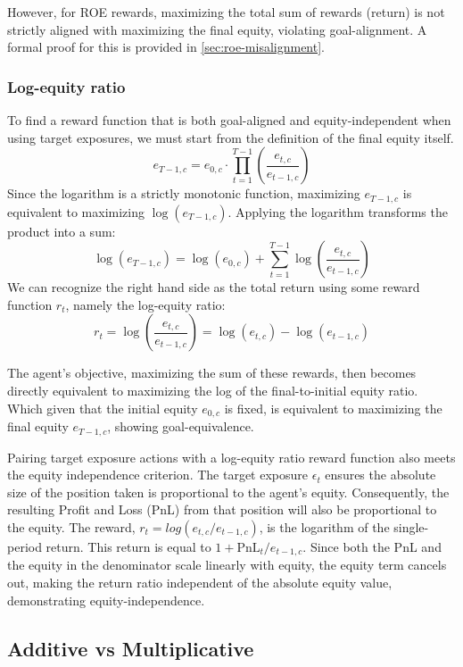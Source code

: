 However, for ROE rewards, maximizing the total sum of rewards (return) is not strictly aligned with maximizing the final equity, violating goal-alignment. A formal proof for this is provided in \cref{sec:roe-misalignment}. 

\subsubsection{Log-equity ratio}

To find a reward function that is both goal-aligned and equity-independent when using target exposures, we must start from the definition of the final equity itself.
$$
e_{T-1,c} = e_{0,c} \cdot \prod_{t=1}^{T-1} \left(\frac{e_{t,c}}{e_{t-1,c}}\right)
$$
Since the logarithm is a strictly monotonic function, maximizing $e_{T-1,c}$ is equivalent to maximizing $\log(e_{T-1,c})$. Applying the logarithm transforms the product into a sum:
$$
\log(e_{T-1,c}) = \log(e_{0,c}) + \sum_{t=1}^{T-1} \log\left(\frac{e_{t,c}}{e_{t-1,c}}\right)
$$
We can recognize the right hand side as the total return using some reward function $r_t$, namely the log-equity ratio: 
$$
r_t = \log\left(\frac{e_{t,c}}{e_{t-1,c}}\right) = \log(e_{t,c}) - \log(e_{t-1,c})
$$

The agent's objective, maximizing the sum of these rewards, then becomes directly equivalent to maximizing the log of the final-to-initial equity ratio. Which given that the initial equity $e_{0,c}$ is fixed, is equivalent to maximizing the final equity $e_{T-1,c}$, showing goal-equivalence.

Pairing target exposure actions with a log-equity ratio reward function also meets the equity independence criterion. The target exposure $\epsilon_t$ ensures the absolute size of the position taken is proportional to the agent's equity. Consequently, the resulting Profit and Loss (PnL) from that position will also be proportional to the equity. The reward, $r_t = log(e_{t,c} / e_{t-1,c})$, is the logarithm of the single-period return. This return is equal to $1+\text{PnL}_t/e_{t-1,c}$. Since both the PnL and the equity in the denominator scale linearly with equity, the equity term cancels out, making the return ratio independent of the absolute equity value, demonstrating equity-independence.

\subsection{Additive vs Multiplicative}

